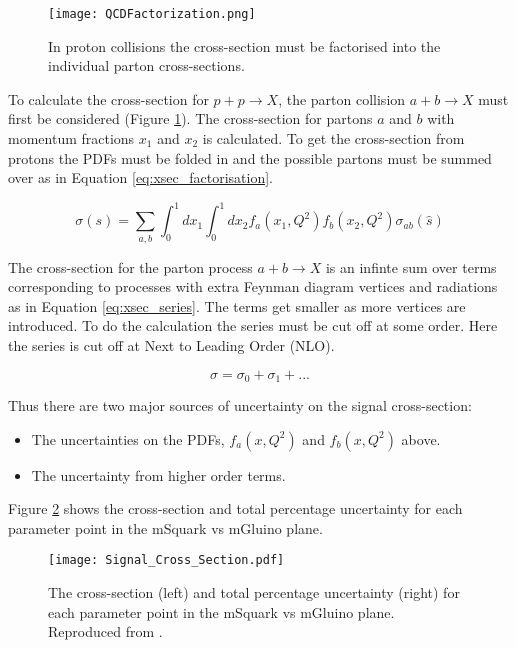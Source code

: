 \begin{figure}
\begin{center}
\texttt{[image: QCDFactorization.png]}
\end{center}
\caption{In proton collisions the cross-section must be factorised into the 
individual parton cross-sections.}
\label{fig:QCDFactorization}
\end{figure}

To calculate the cross-section for $p + p \rightarrow X$, the parton collision 
$a + b \rightarrow X$ must first be considered (Figure 
\ref{fig:QCDFactorization}). The cross-section for partons $a$ and $b$ with 
momentum fractions $x_{1}$ and $x_{2}$ is calculated. To get the cross-section 
from protons the PDFs must be folded in and the possible 
partons must be summed over as in Equation \ref{eq:xsec_factorisation}.

\begin{equation}
\sigma(s) =
\displaystyle\sum\limits_{a,b}\int_{0}^{1}dx_{1}\int_{0}^{1}dx_{2}f_{a}(x_{1},Q^{2})f_{b}(x_{2},Q^{2})\sigma_{ab}(\hat{s})
\label{eq:xsec_factorisation}
\end{equation}

The cross-section for the parton process $a + b \rightarrow X$ is an infinte sum
over terms corresponding to processes with extra Feynman diagram vertices and 
radiations as in Equation \ref{eq:xsec_series}. The terms get smaller as more 
vertices are introduced. To do the calculation the series must be cut off at 
some order. Here the series is cut off at Next to Leading Order (NLO).

\begin{equation}
\sigma = \sigma_{0} + \sigma_{1} + ...
\label{eq:xsec_series}
\end{equation}

Thus there are two major sources of uncertainty on the signal cross-section:

\begin{itemize} 
\item The uncertainties on the PDFs, $f_{a}(x,Q^{2})$ and $f_{b}(x,Q^{2})$ above.
\item The uncertainty from higher order terms.
\end{itemize}

Figure \ref{fig:xsec_unc} shows the cross-section and total percentage 
uncertainty for each parameter point in the mSquark vs mGluino plane.

\begin{figure}
\begin{center}
\texttt{[image: Signal\_Cross\_Section.pdf]}
\end{center}
\caption{The cross-section (left) and total percentage uncertainty (right) for 
each parameter point in the mSquark vs mGluino plane. Reproduced from 
\cite{ra3}.}
\label{fig:xsec_unc}
\end{figure}

